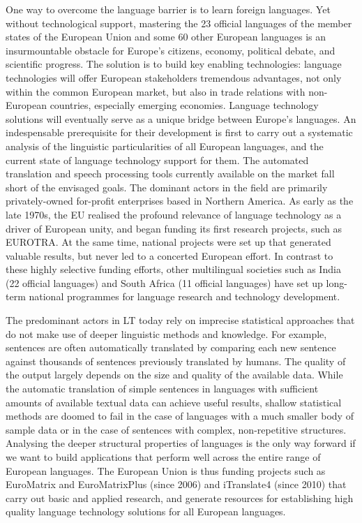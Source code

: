 \documentclass{../../metanetpaper}
\begin{document}
\begin{multicols}{2}
One way to overcome the language barrier is to learn foreign languages. Yet without technological support, mastering the 23 official languages of the member states of the European Union and some 60 other European languages is an insurmountable obstacle for Europe’s citizens, economy, political debate, and scientific progress. 
The solution is to build key enabling technologies: language technologies will offer European stakeholders tremendous advantages, not only within the common European market, but also in trade relations with non-European countries, especially emerging economies. Language technology solutions will eventually serve as a unique bridge between Europe's languages. An indespensable prerequisite for their development is first to carry out a systematic analysis of the linguistic particularities of all European languages, and the current state of language technology support for them.  
The automated translation and speech processing tools currently available on the market fall short of the envisaged goals. The dominant actors in the field are primarily privately-owned for-profit enterprises based in Northern America. As early as the late 1970s, the EU realised the profound relevance of language technology as a driver of European unity, and began funding its first research projects, such as EUROTRA. At the same time, national projects were set up that generated valuable results, but never led to a concerted European effort. In contrast to these highly selective funding efforts, other multilingual societies such as India (22 official languages) and South Africa (11 official languages) have set up long-term national programmes for language research and technology development. 

The predominant actors in LT today rely on imprecise statistical approaches that do not make use of deeper linguistic methods and knowledge. For example, sentences are often automatically translated by comparing each new sentence against thousands of sentences previously translated by humans. The quality of the output largely depends on the size and quality of the available data. While the automatic translation of simple sentences in languages with sufficient amounts of available textual data can achieve useful results, shallow statistical methods are doomed to fail in the case of languages with a much smaller body of sample data or in the case of sentences with complex, non-repetitive structures. Analysing the deeper structural properties of languages is the only way forward if we want to build applications that perform well across the entire range of European languages.
The European Union is thus funding projects such as EuroMatrix and EuroMatrixPlus (since 2006) and iTranslate4 (since 2010) that carry out basic and applied research, and generate resources for establishing high quality language technology solutions for all European languages. 


\end{multicols}
\end{document}
